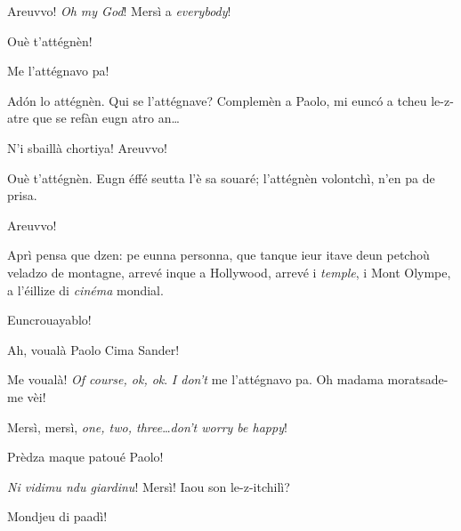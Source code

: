 \begin{drama}
\Cimaspeaks Areuvvo! \textit{Oh my God}! Mersì a \textit{everybody}!

\Conducteurspeaks Ouè t'attégnèn!


\Cimaspeaks Me l'attégnavo pa!


\Conducteurspeaks Ad\'on lo attégnèn. Qui se l'attégnave? Complemèn a Paolo, mi euncó a tcheu le-z-atre que se refàn eugn atro an\ldots

\Cimaspeaks{} N'i sbaillà chortiya! Areuvvo!

\Conducteurspeaks Ouè t'attégnèn. Eugn éffé seutta l'è sa souaré; l'attégnèn volontchì, n'en pa de prisa.

\Cimaspeaks{} Areuvvo!

\Conducteurspeaks{} Aprì pensa que dzen: pe eunna personna, que tanque ieur itave deun petchoù veladzo de montagne, arrevé inque a Hollywood, arrevé i \textit{temple}, i Mont Olympe, a l'éillize di \textit{cinéma} mondial.

\Vallettaspeaks Euncrouayablo!

\Conducteurspeaks Ah, voualà Paolo Cima Sander!


\Cimaspeaks{} Me voualà! \textit{Of course, ok, ok}. \textit{I don't} me l'attégnavo pa.  Oh madama moratsade-me vèi!


\Cimaspeaks Mersì, mersì, \textit{one, two, three}\ldots \textit{don't worry be happy}!

\Conducteurspeaks Prèdza maque patoué Paolo!

\Cimaspeaks{} \textit{Ni vidimu ndu giardinu}! Mersì!  Iaou son le-z-itchilì?


\Cimaspeaks{} Mondjeu di paadì!



\end{drama}
